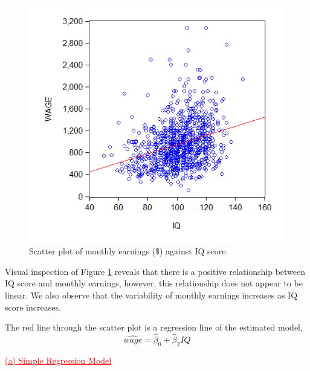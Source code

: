 \documentclass[12pt]{report}
\begin{document}
\vspace{-\baselineskip}
\begin{figure}[H]
	\centerline{\includegraphics{q3_10}}
	\caption{Scatter plot of monthly earnings (\$) against IQ score.}
	\label{fig:scat1}
\end{figure}
\vspace{-\baselineskip}
\noindent Visual inspection of Figure \ref{fig:scat1} reveals that there is a positive relationship between IQ score and monthly earnings, however, this relationship does not appear to be linear. We also observe that the variability of monthly earnings increases as IQ score increases. \par
\noindent The red line through the scatter plot is a regression line of the estimated model,
$$\widehat{wage} = \hat{\beta}_0 + \hat{\beta}_2IQ$$

\noindent \textcolor{red}{\underline{(a) Simple Regression Model}}
\end{document}
